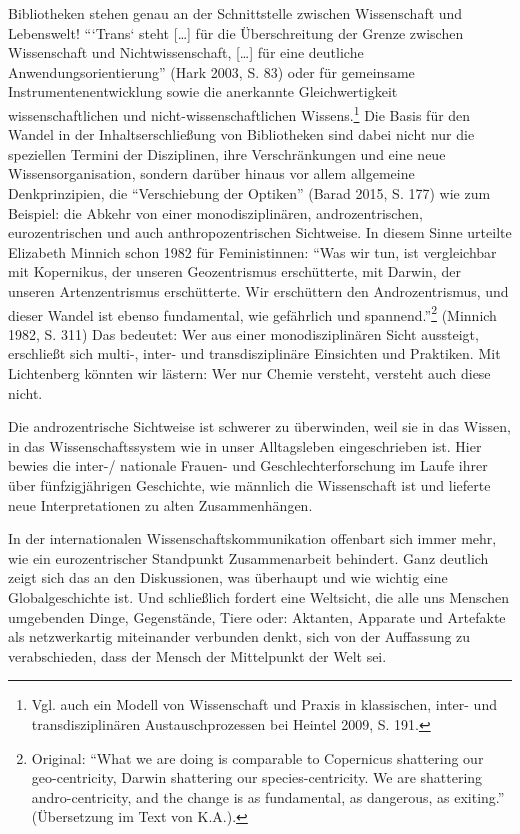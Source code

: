 Bibliotheken stehen genau an der Schnittstelle zwischen Wissenschaft und
Lebenswelt! \enquote{`Trans` steht {[}\ldots{}{]} für die Überschreitung
der Grenze zwischen Wissenschaft und Nichtwissenschaft, {[}\ldots{}{]}
für eine deutliche Anwendungsorientierung} (Hark 2003, S. 83) oder für
gemeinsame Instrumentenentwicklung sowie die anerkannte Gleichwertigkeit
wissenschaftlichen und nicht-wissenschaftlichen Wissens.\footnote{Vgl.
  auch ein Modell von Wissenschaft und Praxis in klassischen, inter- und
  transdisziplinären Austauschprozessen bei Heintel 2009, S. 191.} Die
Basis für den Wandel in der Inhaltserschließung von Bibliotheken sind
dabei nicht nur die speziellen Termini der Disziplinen, ihre
Verschränkungen und eine neue Wissensorganisation, sondern darüber
hinaus vor allem allgemeine Denkprinzipien, die \enquote{Verschiebung
der Optiken} (Barad 2015, S. 177) wie zum Beispiel: die Abkehr von einer
monodisziplinären, androzentrischen, eurozentrischen und auch
anthropozentrischen Sichtweise. In diesem Sinne urteilte Elizabeth
Minnich schon 1982 für Feministinnen: \enquote{Was wir tun, ist
vergleichbar mit Kopernikus, der unseren Geozentrismus erschütterte, mit
Darwin, der unseren Artenzentrismus erschütterte. Wir erschüttern den
Androzentrismus, und dieser Wandel ist ebenso fundamental, wie
gefährlich und spannend.}\footnote{Original: \enquote{What we are doing
  is comparable to Copernicus shattering our geo-centricity, Darwin
  shattering our species-centricity. We are shattering andro-centricity,
  and the change is as fundamental, as dangerous, as exiting.}
  (Übersetzung im Text von K.A.).} (Minnich 1982, S. 311) Das bedeutet:
Wer aus einer monodisziplinären Sicht aussteigt, erschließt sich multi-,
inter- und transdisziplinäre Einsichten und Praktiken. Mit Lichtenberg
könnten wir lästern: Wer nur Chemie versteht, versteht auch diese nicht.

Die androzentrische Sichtweise ist schwerer zu überwinden, weil sie in
das Wissen, in das Wissenschaftssystem wie in unser Alltagsleben
eingeschrieben ist. Hier bewies die inter-/ nationale Frauen- und
Geschlechterforschung im Laufe ihrer über fünfzigjährigen Geschichte,
wie männlich die Wissenschaft ist und lieferte neue Interpretationen zu
alten Zusammenhängen.

In der internationalen Wissenschaftskommunikation offenbart sich immer
mehr, wie ein eurozentrischer Standpunkt Zusammenarbeit behindert. Ganz
deutlich zeigt sich das an den Diskussionen, was überhaupt und wie
wichtig eine Globalgeschichte ist. Und schließlich fordert eine
Weltsicht, die alle uns Menschen umgebenden Dinge, Gegenstände, Tiere
oder: Aktanten, Apparate und Artefakte als netzwerkartig miteinander
verbunden denkt, sich von der Auffassung zu verabschieden, dass der
Mensch der Mittelpunkt der Welt sei.

